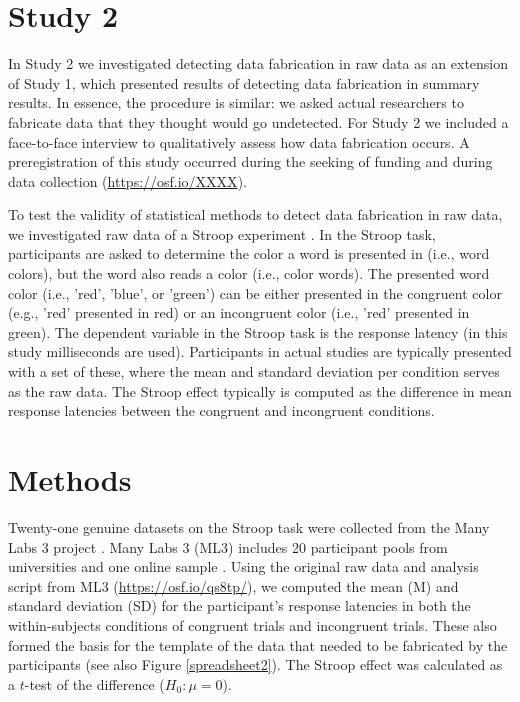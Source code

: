 \documentclass{article}
\begin{document}
\section*{Study 2}

In Study 2 we investigated detecting data fabrication in raw data as an extension of Study 1, which presented results of detecting data fabrication in summary results. In essence, the procedure is similar: we asked actual researchers to fabricate data that they thought would go undetected. For Study 2 we included a face-to-face interview to qualitatively assess how data fabrication occurs. A preregistration of this study occurred during the seeking of funding \citep{10.3897/rio.2.e8860} and during data collection (\url{https://osf.io/XXXX}).

To test the validity of statistical methods to detect data fabrication in raw data, we investigated raw data of a Stroop experiment \citep{Stroop_1935}. In the Stroop task, participants are asked to determine the color a word is presented in (i.e., word colors), but the word also reads a color (i.e., color words). The presented word color (i.e., 'red', 'blue', or 'green') can be either presented in the congruent color (e.g., 'red' presented in red) or an incongruent color (i.e., 'red' presented in green). The dependent variable in the Stroop task is the response latency (in this study milliseconds are used). Participants in actual studies are typically presented with a set of these, where the mean and standard deviation per condition serves as the raw data. The Stroop effect typically is computed as the difference in mean response latencies between the congruent and incongruent conditions.

\section*{Methods}


Twenty-one genuine datasets on the Stroop task were collected from the Many Labs 3 project \citep[\url{https://osf.io/n8xa7/};][]{Ebersole201668}. Many Labs 3 (ML3) includes 20 participant pools from universities and one online sample \citep[the original preregistration mentioned 20 datasets, accidentally overlooking the online sample;][]{10.3897/rio.2.e8860}. Using the original raw data and analysis script from ML3 (\url{https://osf.io/qs8tp/}), we computed the mean (M) and standard deviation (SD) for the participant's response latencies in both the within-subjects conditions of congruent trials and incongruent trials. These also formed the basis for the template of the data that needed to be fabricated by the participants (see also Figure \ref{spreadsheet2}). The Stroop effect was calculated as a $t$-test of the difference ($H_0:\mu=0$).
\end{document}

